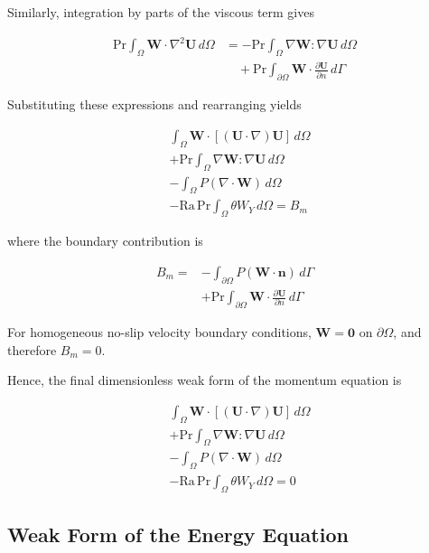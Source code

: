 \documentclass[preprint,3p,number]{elsarticle}
\begin{document}
Similarly, integration by parts of the viscous term gives

\begin{align}
\mathrm{Pr}\int_{\Omega}
\mathbf{W}\cdot\nabla^2\mathbf{U}\,d\Omega
&=-\mathrm{Pr}\int_{\Omega}
\nabla\mathbf{W}:\nabla\mathbf{U}\,d\Omega
\nonumber\\
&\quad+\mathrm{Pr}\int_{\partial\Omega}
\mathbf{W}\cdot\frac{\partial\mathbf{U}}{\partial n}
\,d\Gamma
\end{align}

Substituting these expressions and rearranging yields

\begin{align}
&\int_{\Omega}\mathbf{W}\cdot
[(\mathbf{U}\cdot\nabla)\mathbf{U}]\,d\Omega
\nonumber\\
&+\mathrm{Pr}\int_{\Omega}
\nabla\mathbf{W}:\nabla\mathbf{U}\,d\Omega
\nonumber\\
&-\int_{\Omega}P(\nabla\cdot\mathbf{W})\,d\Omega
\nonumber\\
&-\mathrm{Ra}\,\mathrm{Pr}
\int_{\Omega}\theta W_Y\,d\Omega
=B_m
\end{align}

where the boundary contribution is

\begin{align}
B_m={}&-\int_{\partial\Omega}
P(\mathbf{W}\cdot\mathbf{n})\,d\Gamma
\nonumber\\
&+\mathrm{Pr}\int_{\partial\Omega}
\mathbf{W}\cdot\frac{\partial\mathbf{U}}{\partial n}
\,d\Gamma
\end{align}

For homogeneous no-slip velocity boundary conditions,
$\mathbf{W}=\mathbf{0}$ on $\partial\Omega$, and therefore
$B_m=0$.

Hence, the final dimensionless weak form of the momentum equation
is

\begin{equation}
\boxed{
\begin{aligned}
&\int_{\Omega}\mathbf{W}\cdot
[(\mathbf{U}\cdot\nabla)\mathbf{U}]\,d\Omega\\
&+\mathrm{Pr}\int_{\Omega}
\nabla\mathbf{W}:\nabla\mathbf{U}\,d\Omega\\
&-\int_{\Omega}P(\nabla\cdot\mathbf{W})\,d\Omega\\
&-\mathrm{Ra}\,\mathrm{Pr}
\int_{\Omega}\theta W_Y\,d\Omega=0
\end{aligned}
}
\end{equation}

\subsection{Weak Form of the Energy Equation}
\end{document}
